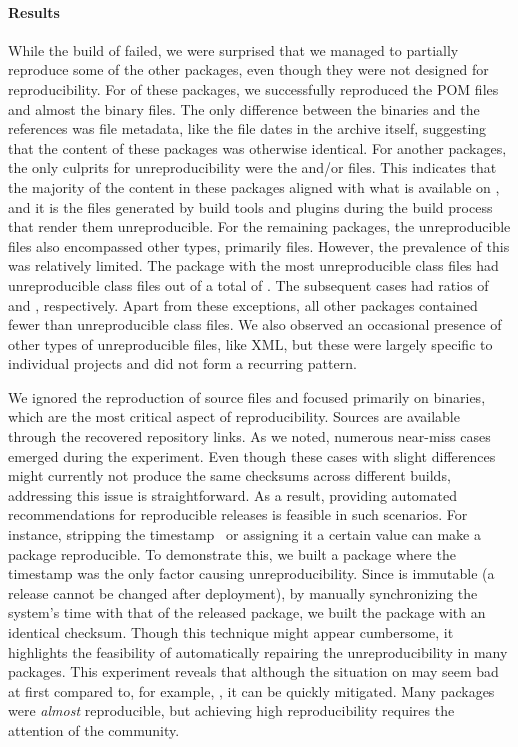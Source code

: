 \documentclass[smallextended]{svjour3}
\newcommand{\maven}[1]{\tool{Maven{#1}}}
\newcommand{\central}{\tool{Maven Central}}
\begin{document}
\paragraph{Results}
While the build of  failed, we were surprised that we managed to partially reproduce some of the other packages, even though they were not designed for reproducibility.
For  of these packages, we successfully reproduced the POM files and almost the binary files. The only difference between the binaries and the references was file metadata, like the file dates in the archive itself, suggesting that the content of these packages was otherwise identical. For another  packages, the only culprits for unreproducibility were the  and/or  files. This indicates that the majority of the content in these packages aligned with what is available on \central{}, and it is the files generated by build tools and plugins during the build process that render them unreproducible. For the remaining  packages, the unreproducible files also encompassed other types, primarily  files. However, the prevalence of this was relatively limited. The package with the most unreproducible class files had  unreproducible class files out of a total of . The subsequent cases had ratios of  and , respectively. Apart from these exceptions, all other packages contained fewer than  unreproducible class files. We also observed an occasional presence of other types of unreproducible files, like XML, but these were largely specific to individual projects and did not form a recurring pattern.

We ignored the reproduction of source files and focused primarily on binaries, which are the most critical aspect of reproducibility.
Sources are available through the recovered repository links.
As we noted, numerous near-miss cases emerged during the experiment. Even though these cases with slight differences might currently not produce the same checksums across different builds, addressing this issue is straightforward. As a result, providing automated recommendations for reproducible releases is feasible in such scenarios. For instance, stripping the timestamp~\cite{ReproducibleBuildMavenPlugin} or assigning it a certain value can make a package reproducible. To demonstrate this, we built a package where the timestamp was the only factor causing unreproducibility. Since \maven{} is immutable (a release cannot be changed after deployment), by manually synchronizing the system's time with that of the released package, we built the package with an identical checksum. Though this technique might appear cumbersome, it highlights the feasibility of automatically repairing the unreproducibility in many packages. This experiment reveals that although the situation on \maven{} may seem bad at first compared to, for example, , it can be quickly mitigated. Many packages were \emph{almost} reproducible, but achieving high reproducibility requires the attention of the community.
\end{document}
